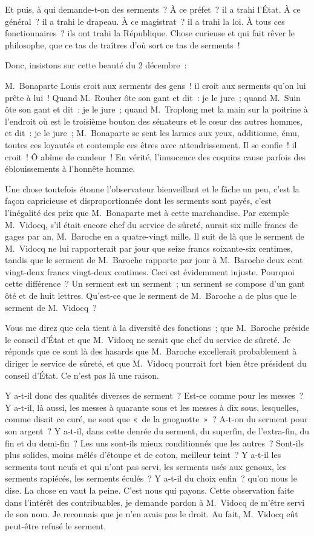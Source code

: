 \documentclass[french,twoside]{book} %
\begin{document}
\noindent Et puis, à qui demande-t-on des serments ? À ce préfet ? il a trahi l’État. À ce général ? il a trahi le drapeau. À ce magistrat ? il a trahi la loi. À tous ces fonctionnaires ? ils ont trahi la République. Chose curieuse et qui fait rêver le philosophe, que ce tas de traîtres d’où sort ce tas de serments !\par
Donc, insistons sur cette beauté du 2 décembre :\par
M. Bonaparte Louis croit aux serments des gens ! il croit aux serments qu’on lui prête à lui ! Quand M. Rouher ôte son gant et dit : je le jure ; quand M. Suin ôte son gant et dit : je le jure ; quand M. Troplong met la main sur la poitrine à l’endroit où est le troisième bouton des sénateurs et le cœur des autres hommes, et dit : je le jure ; M. Bonaparte se sent les larmes aux yeux, additionne, ému, toutes ces loyautés et contemple ces êtres avec attendrissement. Il se confie ! il croit ! Ô abîme de candeur ! En vérité, l’innocence des coquins cause parfois des éblouissements à l’honnête homme.\par
Une chose toutefois étonne l’observateur bienveillant et le fâche un peu, c’est la façon capricieuse et disproportionnée dont les serments sont payés, c’est l’inégalité des prix que M. Bonaparte met à cette marchandise. Par exemple M. Vidocq, s’il était encore chef du service de sûreté, aurait six mille francs de gages par an, M. Baroche en a quatre-vingt mille. Il suit de là que le serment de M. Vidocq ne lui rapporterait par jour que seize francs soixante-six centimes, tandis que le serment de M. Baroche rapporte par jour à M. Baroche deux cent vingt-deux francs vingt-deux centimes. Ceci est évidemment injuste. Pourquoi cette différence ? Un serment est un serment ; un serment se compose d’un gant ôté et de huit lettres. Qu’est-ce que le serment de M. Baroche a de plus que le serment de M. Vidocq ?\par
Vous me direz que cela tient à la diversité des fonctions ; que M. Baroche préside le conseil d’État et que M. Vidocq ne serait que chef du service de sûreté. Je réponds que ce sont là des hasards que M. Baroche excellerait probablement à diriger le service de sûreté, et que M. Vidocq pourrait fort bien être président du conseil d’État. Ce n’est pas là une raison.\par
Y a-t-il donc des qualités diverses de serment ? Est-ce comme pour les messes ? Y a-t-il, là aussi, les messes à quarante sous et les messes à dix sous, lesquelles, comme disait ce curé, ne sont que « de la gnognotte » ? A-t-on du serment pour son argent ? Y a-t-il, dans cette denrée du serment, du superfin, de l’extra-fin, du fin et du demi-fin ? Les uns sont-ils mieux conditionnés que les autres ? Sont-ils plus solides, moins mêlés d’étoupe et de coton, meilleur teint ? Y a-t-il les serments tout neufs et qui n’ont pas servi, les serments usés aux genoux, les serments rapiécés, les serments éculés ? Y a-t-il du choix enfin ? qu’on nous le dise. La chose en vaut la peine. C’est nous qui payons. Cette observation faite dans l’intérêt des contribuables, je demande pardon à M. Vidocq de m’être servi de son nom. Je reconnais que je n’en avais pas le droit. Au fait, M. Vidocq eût peut-être refusé le serment.
\end{document}
